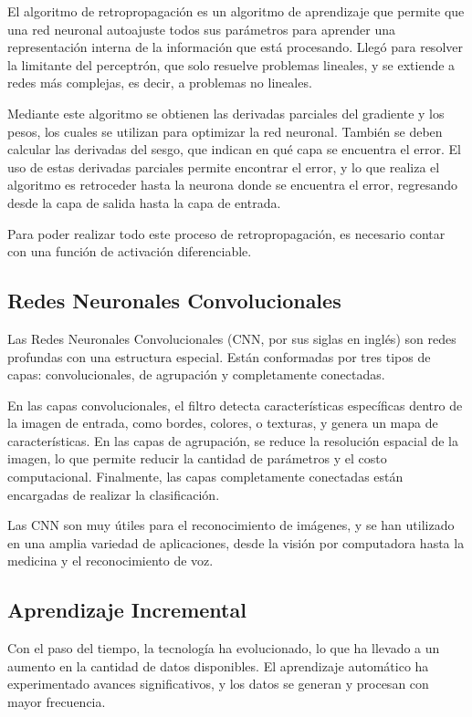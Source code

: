         El algoritmo de retropropagación es un algoritmo de aprendizaje que permite que una red neuronal autoajuste todos sus parámetros para aprender una representación interna de la información que está procesando. Llegó para resolver la limitante del perceptrón, que solo resuelve problemas lineales, y se extiende a redes más complejas, es decir, a problemas no lineales.

        Mediante este algoritmo se obtienen las derivadas parciales del gradiente y los pesos, los cuales se utilizan para optimizar la red neuronal. También se deben calcular las derivadas del sesgo, que indican en qué capa se encuentra el error. El uso de estas derivadas parciales permite encontrar el error, y lo que realiza el algoritmo es retroceder hasta la neurona donde se encuentra el error, regresando desde la capa de salida hasta la capa de entrada.

        Para poder realizar todo este proceso de retropropagación, es necesario contar con una función de activación diferenciable.

    \subsection{Redes Neuronales Convolucionales}

        Las Redes Neuronales Convolucionales (CNN, por sus siglas en inglés) son redes profundas con una estructura especial. Están conformadas por tres tipos de capas: convolucionales, de agrupación y completamente conectadas.

        En las capas convolucionales, el filtro detecta características específicas dentro de la imagen de entrada, como bordes, colores, o texturas, y genera un mapa de características. En las capas de agrupación, se reduce la resolución espacial de la imagen, lo que permite reducir la cantidad de parámetros y el costo computacional. Finalmente, las capas completamente conectadas están encargadas de realizar la clasificación.

        Las CNN son muy útiles para el reconocimiento de imágenes, y se han utilizado en una amplia variedad de aplicaciones, desde la visión por computadora hasta la medicina y el reconocimiento de voz.


    \subsection{Aprendizaje Incremental}

        Con el paso del tiempo, la tecnología ha evolucionado, lo que ha llevado a un aumento en la cantidad de datos disponibles. El aprendizaje automático ha experimentado avances significativos, y los datos se generan y procesan con mayor frecuencia.

